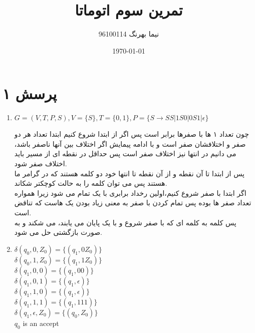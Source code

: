 \documentclass[a4paper]{article}
\title{تمرین سوم اتوماتا}
\author{نیما بهرنگ 96100114}
\date{\today}
\begin{document}
\maketitle
{}


\section*{پرسش ۱}

\begin{enumerate}

\item{}

\begin{latin}
$ G = (V,T,P,S), V=\{S\}, T=\{0,1\}, P = \{S \to SS | 1S0 | 0S1 | \epsilon\} $
\end{latin}
چون تعداد ۱ ها با صفرها برابر است پس اگر از ابتدا شروع کنیم ابتدا تعداد هر دو صفر و اختلافشان صفر است و با ادامه پیمایش اگر اختلاف بین آنها ناصفر باشد، می دانیم در انتها نیز اختلاف صفر است پس حداقل در نقطه ای از مسیر باید اختلاف صفر شود.\\
پس از ابتدا تا آن نقطه و از آن نقطه تا انتها خود دو کلمه هستند که در گرامر ما هستند پس می توان کلمه را به حالت کوچکتر شکاند.\\
اگر ابتدا با صفر شروع کنیم،اولین رخداد برابری با یک تمام می شود زیرا همواره تعداد صفر ها بوده پس تمام کردن با صفر به معنی زیاد بودن یک هاست که تناقض است.\\
پس کلمه به کلمه ای که با صفر شروع و با یک پایان می یابند، می شکند و به صورت بازگشتی حل می شود.

\item{}

\begin{latin}

$ \delta( q_0,0,Z_0) = \{( q_1,0Z_0 )\} $\\
$ \delta( q_0,1,Z_0) = \{( q_1,1Z_0 )\} $\\
$ \delta( q_1,0,0) = \{( q_1,00 )\} $\\
$ \delta( q_1,0,1) = \{( q_1,\epsilon)\} $\\
$ \delta( q_1,1,0) = \{( q_1,\epsilon)\} $\\
$ \delta( q_1,1,1) = \{( q_1,111)\} $\\
$ \delta( q_1,\epsilon,Z_0) = \{( q_0,Z_0)\} $\\
$q_0$ is an accept
\end{latin}


\end{enumerate}
\end{document}
